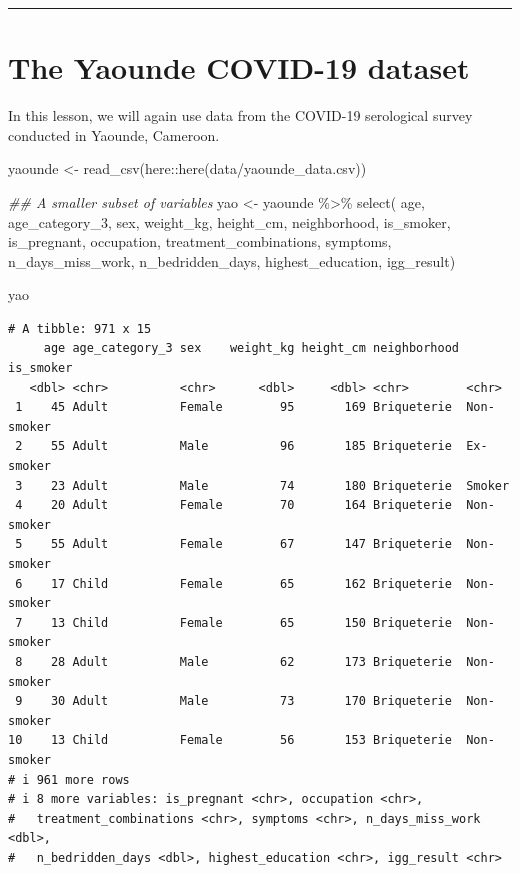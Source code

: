 \documentclass[
  letterpaper,
  DIV=11,
  numbers=noendperiod]{scrreprt}
\newenvironment{Shaded}{\begin{snugshade}}{\end{snugshade}}
\newcommand{\DocumentationTok}[1]{\textcolor[rgb]{0.37,0.37,0.37}{\textit{#1}}}
\newcommand{\FunctionTok}[1]{\textcolor[rgb]{0.28,0.35,0.67}{#1}}
\newcommand{\NormalTok}[1]{\textcolor[rgb]{0.00,0.23,0.31}{#1}}
\newcommand{\OtherTok}[1]{\textcolor[rgb]{0.00,0.23,0.31}{#1}}
\newcommand{\SpecialCharTok}[1]{\textcolor[rgb]{0.37,0.37,0.37}{#1}}
\newcommand{\StringTok}[1]{\textcolor[rgb]{0.13,0.47,0.30}{#1}}
\begin{document}
\begin{center}\rule{0.5\linewidth}{0.5pt}\end{center}

\section{The Yaounde COVID-19
dataset}\label{the-yaounde-covid-19-dataset-2}

In this lesson, we will again use data from the COVID-19 serological
survey conducted in Yaounde, Cameroon.

\begin{Shaded}
\begin{Highlighting}[]
\NormalTok{yaounde }\OtherTok{\textless{}{-}} \FunctionTok{read\_csv}\NormalTok{(here}\SpecialCharTok{::}\FunctionTok{here}\NormalTok{(}\StringTok{\textquotesingle{}data/yaounde\_data.csv\textquotesingle{}}\NormalTok{))}

\DocumentationTok{\#\# A smaller subset of variables}
\NormalTok{yao }\OtherTok{\textless{}{-}}\NormalTok{ yaounde }\SpecialCharTok{\%\textgreater{}\%} \FunctionTok{select}\NormalTok{(}
\NormalTok{  age, age\_category\_3, sex, weight\_kg, height\_cm,}
\NormalTok{  neighborhood, is\_smoker, is\_pregnant, occupation,}
\NormalTok{  treatment\_combinations, symptoms, n\_days\_miss\_work, n\_bedridden\_days,}
\NormalTok{  highest\_education, igg\_result)}

\NormalTok{yao}
\end{Highlighting}
\end{Shaded}

\begin{verbatim}
# A tibble: 971 x 15
     age age_category_3 sex    weight_kg height_cm neighborhood is_smoker 
   <dbl> <chr>          <chr>      <dbl>     <dbl> <chr>        <chr>     
 1    45 Adult          Female        95       169 Briqueterie  Non-smoker
 2    55 Adult          Male          96       185 Briqueterie  Ex-smoker 
 3    23 Adult          Male          74       180 Briqueterie  Smoker    
 4    20 Adult          Female        70       164 Briqueterie  Non-smoker
 5    55 Adult          Female        67       147 Briqueterie  Non-smoker
 6    17 Child          Female        65       162 Briqueterie  Non-smoker
 7    13 Child          Female        65       150 Briqueterie  Non-smoker
 8    28 Adult          Male          62       173 Briqueterie  Non-smoker
 9    30 Adult          Male          73       170 Briqueterie  Non-smoker
10    13 Child          Female        56       153 Briqueterie  Non-smoker
# i 961 more rows
# i 8 more variables: is_pregnant <chr>, occupation <chr>,
#   treatment_combinations <chr>, symptoms <chr>, n_days_miss_work <dbl>,
#   n_bedridden_days <dbl>, highest_education <chr>, igg_result <chr>
\end{verbatim}
\end{document}
